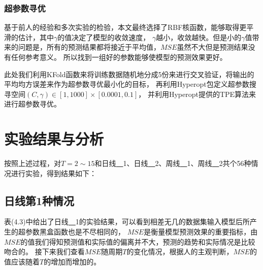 \subsubsection{超参数寻优}

基于前人的经验和多次实验的检验，本文最终选择了RBF核函数，能够取得更平滑的估计，其中$\gamma$的值决定了模型的收敛速度，
$\gamma$越小，收敛越快。但是小的$\gamma$值带来的问题是，所有的预测结果都将接近于平均值，$MSE$虽然不大但是预测结果没有任何参考意义。
所以找到一组好的参数能够使模型的预测效果更好。

此处我们利用KFold函数来将训练数据随机地分成5份来进行交叉验证，将输出的平均均方误差来作为超参数寻优最小化的目标，
再利用Hyperopt包定义超参数搜寻空间$(C,\gamma)\in[1, 1000]\times[0.0001, 0.1]$，
并利用Hyperopt提供的TPE算法来进行超参数寻优。

\section{实验结果与分析}

按照上述过程，对$T=2\sim15$和日线\underline{~~}1、日线\underline{~~}2、周线\underline{~~}1、周线\underline{~~}2共个56种情况进行实验，得到结果如下：

\subsection{日线第1种情况}

表(4.3)中给出了日线\underline{~~}1的实验结果，可以看到相差无几的数据集输入模型后所产生的超参数黑盒函数也是不尽相同的，
$MSE$是衡量模型预测效果的重要指标，由$MSE$的值我们得知预测值和实际值的偏离并不大，预测的趋势和实际情况是比较吻合的。
接下来我们查看$MSE$随周期$T$的变化情况，根据人的主观判断，$MSE$的值应该随着$T$的增加而增加的。

